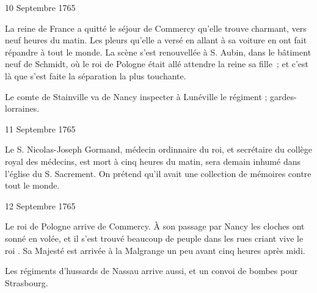                      \begin{diary}{10 Septembre 1765}{}
                        
                        
                           La reine de France a
                           quitté le séjour de
                           Commercy qu'elle trouve
                           charmant, vers
                           neuf heures du matin. Les pleurs qu'elle
                           a versé en allant à sa voiture en ont fait
                           répandre à tout le monde. La scène s'est
                           renouvellée à S. Aubin, dans
                           le bâtiment
                           neuf de Schmidt, où le roi de Pologne était allé
                           attendre la reine sa
                              fille ; et c'est là que
                           s'est faite la séparation la plus touchante. \bigskip
        
        
                        
                           Le comte de Stainville va de
                              Nancy inspecter
                           à Lunéville
                           le régiment ; gardes-lorraines. \bigskip
        
        
                     \end{diary}
                     
                     \begin{diary}{11 Septembre 1765}{}
                        
                        
                           Le S. Nicolas-Joseph Gormand,
                           médecin ordinnaire
                           du roi, et secrétaire du collège royal des médecins,
                           est mort à cinq heures du matin, sera
                           demain inhumé dans l’église du S. Sacrement.
                           On prétend qu'il avait une collection de
                           mémoires contre tout le monde. \bigskip
        
        
                     \end{diary}

                     \begin{diary}{12 Septembre 1765}{}
                        
                        
                           Le roi de Pologne arrive de
                              Commercy.
                           À son passage par Nancy les
                           cloches ont sonné
                           en volée, et il s'est trouvé beaucoup de peuple
                           dans les rues criant \og vive le roi \fg{}. Sa Majesté est
                           arrivée à la Malgrange un
                           peu avant cinq
                           heures après midi. \bigskip
        
        
                         Les régiments d'hussards de Nassau
                           arrive aussi,
                           et un convoi de bombes pour Strasbourg. \bigskip
        
        
                     \end{diary}

